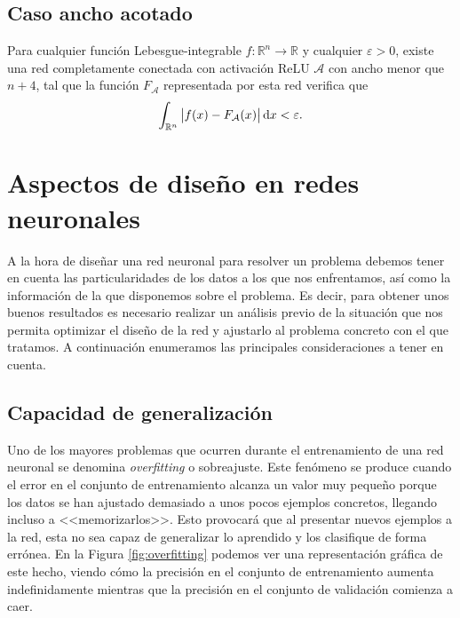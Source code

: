 \documentclass[
  a4paper,
  12pt,
  spanish,
]{scrartcl}
\theoremstyle{teorema-style}
\begin{document}
\subsection{Caso ancho acotado}

Para cualquier función Lebesgue-integrable $f: \mathbb{R}^n \rightarrow \mathbb{R}$ y cualquier $\varepsilon >0$, existe una red completamente conectada con activación ReLU \(\mathcal A\) con ancho menor que $n+4$, tal que la función $F_{\mathcal A}$ representada por esta red verifica que
\[
  \displaystyle \int_{\mathbb{R}^{n}}\left|f(x)-F_{\mathcal A}(x)\right|\dif x < \varepsilon.
\]

\section{Aspectos de diseño en redes neuronales}
\label{sec:diseño}

A la hora de diseñar una red neuronal para resolver un problema debemos tener en cuenta las particularidades de los datos a los que nos enfrentamos, así como la información de la que disponemos sobre el problema. Es decir, para obtener unos buenos resultados es necesario realizar un análisis previo de la situación que nos permita optimizar el diseño de la red y ajustarlo al problema concreto con el que tratamos. A continuación enumeramos las principales consideraciones a tener en cuenta.

\subsection{Capacidad de generalización}

Uno de los mayores problemas que ocurren durante el entrenamiento de una red neuronal se denomina \textit{overfitting} o sobreajuste. Este fenómeno se produce cuando el error en el conjunto de entrenamiento alcanza un valor muy pequeño porque los datos se han ajustado demasiado a unos pocos ejemplos concretos, llegando incluso a <<memorizarlos>>. Esto provocará que al presentar nuevos ejemplos a la red, esta no sea capaz de generalizar lo aprendido y los clasifique de forma errónea. En la Figura \ref{fig:overfitting} podemos ver una representación gráfica de este hecho, viendo cómo la precisión en el conjunto de entrenamiento aumenta indefinidamente mientras que la precisión en el conjunto de validación comienza a caer.
\end{document}

